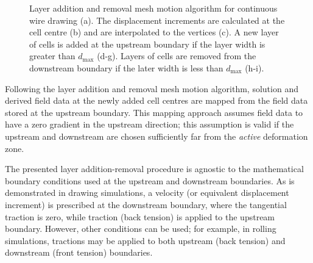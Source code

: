 \documentclass[sn-mathphys,Numbered]{sn-jnl}%
\begin{document}
\begin{figure}[tbh]
	\caption{Layer addition and removal mesh motion algorithm for continuous wire drawing (a). The displacement increments are calculated at the cell centre (b) and are interpolated to the vertices (c). A new layer of cells is added at the upstream boundary if the layer width is greater than $d_{\max}$ (d-g). Layers of cells are removed from the downstream boundary if the later width is less than $d_{\max}$ (h-i).}
	\label{fig:layerAddition}
\end{figure}

Following the layer addition and removal mesh motion algorithm, solution and derived field data at the newly added cell centres are mapped from the field data stored at the upstream boundary.
This mapping approach assumes field data to have a zero gradient in the upstream direction; this assumption is valid if the upstream and downstream are chosen sufficiently far from the \emph{active} deformation zone.

The presented layer addition-removal procedure is agnostic to the mathematical boundary conditions used at the upstream and downstream boundaries.
As is demonstrated in drawing simulations, a velocity (or equivalent displacement increment) is prescribed at the downstream boundary, where the tangential traction is zero, while traction (back tension) is applied to the upstream boundary.
However, other conditions can be used; for example, in rolling simulations, tractions may be applied to both upstream (back tension) and downstream (front tension) boundaries.
\end{document}
